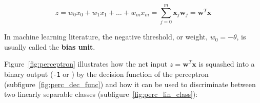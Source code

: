 \documentclass[11pt]{article}
\newcommand{\vect}[1]{\boldsymbol{#1}}
\begin{document}
    \begin{equation}
        \label{eq:perc_dec_func_bias}
        z = w_0 x_0 + w_1 x_1 + \dots + w_m x_m =
        \sum_{j=0}^m \vect{x}_j \vect{w}_j = \vect{w}^T \vect{x}
    \end{equation}

    In machine learning literature, the negative threshold, or weight, $w_0 = - \theta$, is usually called the \textbf{bias unit}.

    Figure~\ref{fig:perceptron} illustrates how the net input $ z = \vect{w}^T \vect{x} $ is squashed into a binary output (\texttt{-1} or ) by the decision function of the perceptron (subfigure~\ref{fig:perc_dec_func}) and how it can be used to discriminate between two linearly separable classes (subfigure~\ref{fig:perc_lin_class}):
\end{document}
